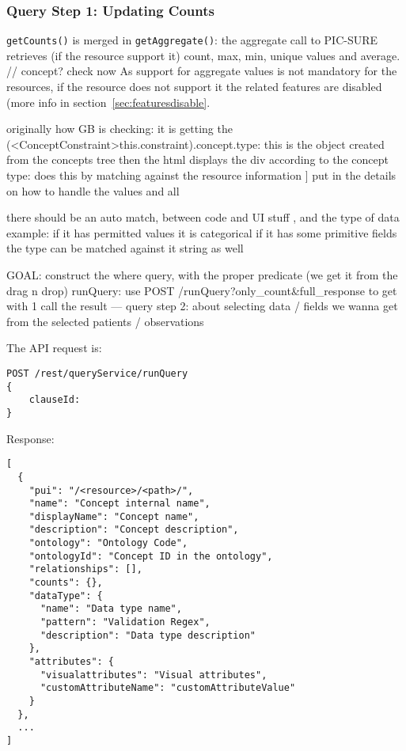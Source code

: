 
\subsubsection{Query Step 1: Updating Counts}
\verb|getCounts()| is merged in \verb|getAggregate()|: the aggregate call to PIC-SURE retrieves (if the resource support it) count, max, min, unique values and average. // concept? check now
As support for aggregate values is not mandatory for the resources, if the resource does not support it the related features are disabled (more info in section~\ref{sec:featuresdisable}.

originally how GB is checking: it is getting the (<ConceptConstraint>this.constraint).concept.type: this is the object created from the concepts tree
then the html displays the div according to the concept type: does this by matching against the resource information ]
put in the details on how to handle the values and all

there should be an auto match, between code and UI stuff , and the type of data
example: if it has permitted values it is categorical
if it has some primitive fields the type can be matched against it
string as well

GOAL: construct the where query, with the proper predicate (we get it from the drag n drop)
runQuery: use POST /runQuery?only\_count\&full\_response to get with 1 call the result
--- query step 2: about selecting data  / fields we wanna get from the selected patients / observations 


The API request is:
\begin{verbatim}
POST /rest/queryService/runQuery
{
    clauseId: 
}
\end{verbatim}

Response:
\begin{verbatim}
[
  {
    "pui": "/<resource>/<path>/",
    "name": "Concept internal name",
    "displayName": "Concept name",
    "description": "Concept description",
    "ontology": "Ontology Code",
    "ontologyId": "Concept ID in the ontology",
    "relationships": [],
    "counts": {},
    "dataType": {
      "name": "Data type name",
      "pattern": "Validation Regex",
      "description": "Data type description"
    },
    "attributes": {
      "visualattributes": "Visual attributes",
      "customAttributeName": "customAttributeValue"
    }
  },
  ...
]
\end{verbatim}


